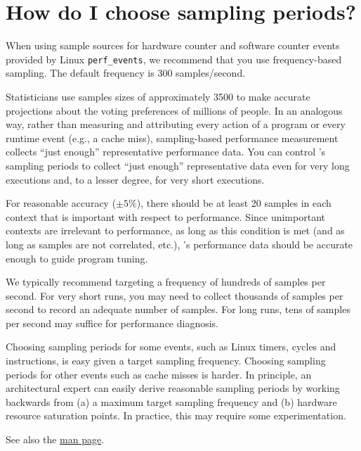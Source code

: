 \documentclass[11pt,letterpaper]{report}
\begin{document}
\section{How do I choose \hpcrun{} sampling periods?}
\label{sec:troubleshooting:hpcrun-sample-periods}

When using sample sources for hardware counter and software counter events provided by Linux \verb|perf_events|,
we recommend that you use frequency-based sampling. The default frequency is 300 samples/second.

Statisticians use samples sizes of approximately 3500 to make accurate projections about the voting preferences of millions of people.
In an analogous way, rather than measuring and attributing every action of a program or every runtime event (e.g., a cache miss), sampling-based performance measurement collects ``just enough'' representative performance data.
You can control \hpcrun{}'s sampling periods to collect ``just enough'' representative data even for very long executions and, to a lesser degree, for very short executions.

For reasonable accuracy ($\pm 5\%$), there should be at least 20 samples in each context that is important with respect to performance.
Since unimportant contexts are irrelevant to performance, as long as this condition is met (and as long as samples are not correlated, etc.), \HPCToolkit{}'s performance data should be accurate enough to guide program tuning.

We typically recommend targeting a frequency of hundreds of samples per second.
For very short runs, you may need to collect thousands of samples per second to record an adequate number of samples.
For long runs, tens of samples per second may suffice for performance diagnosis.

Choosing sampling periods for some events, such as Linux timers, cycles and instructions, is easy given a target sampling frequency.
Choosing sampling periods for other events such as cache misses is harder.
In principle, an architectural expert can easily derive reasonable sampling periods by working backwards from (a) a maximum target sampling frequency and (b) hardware resource saturation points.
In practice, this may require some experimentation.

See also the \hpcrun{} \href{http://hpctoolkit.org/man/hpcrun.html}{man page}.
\end{document}

